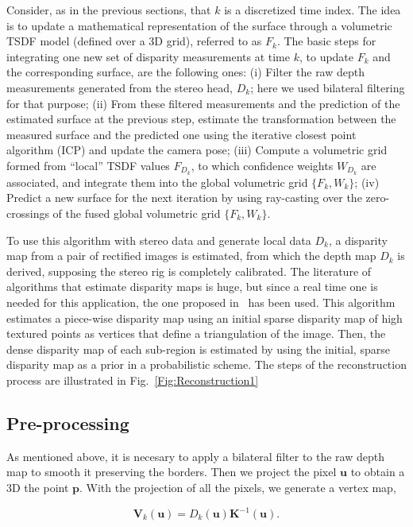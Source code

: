 Consider, as in the previous sections, that $k$ is a discretized time index. The idea is to update a mathematical representation of the surface through a volumetric TSDF model (defined over a 3D grid), referred to as $F_k$. The basic steps for integrating one new set of disparity measurements at time $k$, to update $F_k$ and the corresponding surface, are the following ones: (i) Filter the raw depth measurements generated from the stereo head, $D_k$; here we used bilateral filtering for that purpose; (ii) From these filtered measurements and the prediction of the estimated surface at the previous step, estimate the transformation between the measured surface and the predicted one using the iterative closest point algorithm (ICP) and update the camera pose; (iii) Compute a volumetric grid formed from ``local'' TSDF values $F_{D_k}$, to which confidence weights $W_{D_k}$ are associated, and integrate them into the global volumetric grid $\{F_k,W_k\}$; (iv) Predict a new surface for the next iteration by using ray-casting over the zero-crossings of the fused global volumetric grid $\{F_k,W_k\}$. 

To use this algorithm with stereo data and generate local data $D_k$, a disparity map from a pair of rectified images is estimated, from which the depth map $D_k$ is derived, supposing the stereo rig is completely calibrated. The literature of algorithms that estimate disparity maps is huge, but since a real time one is needed for this application, the one proposed in~\citep{Geiger2010} has been used. This algorithm estimates a piece-wise disparity map using an initial sparse disparity map of high textured points as vertices that define a triangulation of the image. Then, the dense disparity map of each sub-region is estimated by using the initial, sparse disparity map as a prior in a probabilistic scheme. The steps of the reconstruction process are illustrated in Fig.~\ref{Fig:Reconstruction1}

\subsection{Pre-processing}
As mentioned above, it is necesary to apply a bilateral filter to the raw depth map to smooth it preserving the borders.
Then we project the pixel $\mathbf{u}$ to obtain a 3D the point $\mathbf{p}$. With the projection of all the pixels, we generate a vertex map,

\begin{equation}
 \mathbf{V}_k(\mathbf{u}) = D_k(\mathbf{u})\mathbf{K}^{-1}(\mathbf{u}).
\end{equation}

